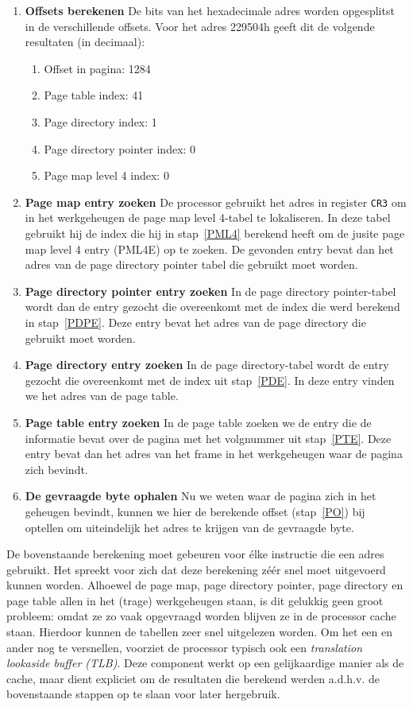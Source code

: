 \begin{enumerate}
\item{\textbf{Offsets berekenen}} De bits van het hexadecimale adres worden opgesplitst in de verschillende offsets. Voor het adres 229504h geeft dit de volgende resultaten (in decimaal):
    \begin{enumerate}
    \item{Offset in pagina:}\label{PO} 1284
    \item{Page table index:}\label{PTE} 41
    \item{Page directory index:}\label{PDE} 1
    \item{Page directory pointer index:}\label{PDPE} 0
    \item{Page map level 4 index:}\label{PML4} 0
    \end{enumerate}
\item{\textbf{Page map entry zoeken}} De processor gebruikt het adres in register \texttt{CR3} om in het werkgeheugen de page map level 4-tabel te lokaliseren. In deze tabel gebruikt hij de index die hij in stap~\ref{PML4} berekend heeft om de jusite page map level 4 entry (PML4E) op te zoeken. De gevonden entry bevat dan het adres van de page directory pointer tabel die gebruikt moet worden.
\item{\textbf{Page directory pointer entry zoeken}} In de page directory pointer-tabel wordt dan de entry gezocht die overeenkomt met de index die werd berekend in stap~\ref{PDPE}. Deze entry bevat het adres van de page directory die gebruikt moet worden.
\item{\textbf{Page directory entry zoeken}} In de page directory-tabel wordt de entry gezocht die overeenkomt met de index uit stap~\ref{PDE}. In deze entry vinden we het adres van de page table.
\item{\textbf{Page table entry zoeken}} In de page table zoeken we de entry die de informatie bevat over de pagina met het volgnummer uit stap~\ref{PTE}. Deze entry bevat dan het adres van het frame in het werkgeheugen waar de pagina zich bevindt.
\item{\textbf{De gevraagde byte ophalen}} Nu we weten waar de pagina zich in het geheugen bevindt, kunnen we hier de berekende offset (stap~\ref{PO}) bij optellen om uiteindelijk het adres te krijgen van de gevraagde byte.
\end{enumerate}

De bovenstaande berekening moet gebeuren voor \'elke instructie die een adres gebruikt. Het spreekt voor zich dat deze berekening z\'e\'er snel moet uitgevoerd kunnen worden. Alhoewel de page map, page directory pointer, page directory en page table allen in het (trage) werkgeheugen staan, is dit gelukkig geen groot probleem: omdat ze zo vaak opgevraagd worden blijven ze in de processor cache staan. Hierdoor kunnen de tabellen zeer snel uitgelezen worden. Om het een en ander nog te versnellen, voorziet de processor typisch ook een \emph{translation lookaside buffer (TLB)}. Deze component werkt op een gelijkaardige manier als de cache, maar dient expliciet om de resultaten die berekend werden a.d.h.v. de bovenstaande stappen op te slaan voor later hergebruik.

